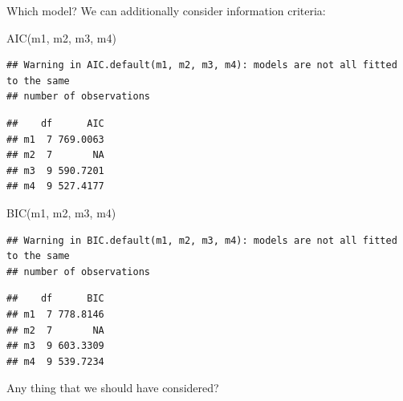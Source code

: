 \documentclass[
  ignorenonframetext,
]{beamer}
\newenvironment{Shaded}{\begin{snugshade}}{\end{snugshade}}
\newcommand{\FunctionTok}[1]{\textcolor[rgb]{0.00,0.00,0.00}{#1}}
\newcommand{\NormalTok}[1]{#1}
\begin{document}
\begin{frame}[fragile]{Which model?}
\protect\hypertarget{which-model}{}
We can additionally consider information criteria:

\vspace{12pt}
\tiny

\begin{Shaded}
\begin{Highlighting}[]
\FunctionTok{AIC}\NormalTok{(m1, m2, m3, m4)}
\end{Highlighting}
\end{Shaded}

\begin{verbatim}
## Warning in AIC.default(m1, m2, m3, m4): models are not all fitted to the same
## number of observations
\end{verbatim}

\begin{verbatim}
##    df      AIC
## m1  7 769.0063
## m2  7       NA
## m3  9 590.7201
## m4  9 527.4177
\end{verbatim}

\begin{Shaded}
\begin{Highlighting}[]
\FunctionTok{BIC}\NormalTok{(m1, m2, m3, m4)}
\end{Highlighting}
\end{Shaded}

\begin{verbatim}
## Warning in BIC.default(m1, m2, m3, m4): models are not all fitted to the same
## number of observations
\end{verbatim}

\begin{verbatim}
##    df      BIC
## m1  7 778.8146
## m2  7       NA
## m3  9 603.3309
## m4  9 539.7234
\end{verbatim}

\vspace{12pt}
\normalsize

Any thing that we should have considered?
\end{frame}
\end{document}
